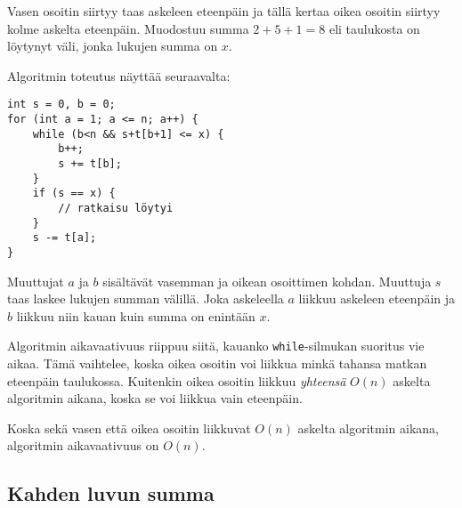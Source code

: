 Vasen osoitin siirtyy taas askeleen eteenpäin
ja tällä kertaa oikea osoitin siirtyy kolme askelta
eteenpäin. Muodostuu summa $2+5+1=8$ eli taulukosta
on löytynyt väli, jonka lukujen summa on $x$.

\begin{center}
\end{center}

Algoritmin toteutus näyttää seuraavalta:

\begin{lstlisting}
int s = 0, b = 0;
for (int a = 1; a <= n; a++) {
    while (b<n && s+t[b+1] <= x) {
        b++;
        s += t[b];
    }
    if (s == x) {
        // ratkaisu löytyi
    }
    s -= t[a];
}
\end{lstlisting}

Muuttujat $a$ ja $b$ sisältävät vasemman ja oikean
osoittimen kohdan.
Muuttuja $s$ taas laskee lukujen summan välillä.
Joka askeleella $a$ liikkuu askeleen eteenpäin
ja $b$ liikkuu niin kauan kuin summa on enintään $x$.

Algoritmin aikavaativuus riippuu siitä,
kauanko \texttt{while}-silmukan suoritus vie aikaa.
Tämä vaihtelee, koska oikea osoitin voi liikkua
minkä tahansa matkan eteenpäin taulukossa.
Kuitenkin oikea osoitin liikkuu \textit{yhteensä}
$O(n)$ askelta algoritmin aikana, koska se voi
liikkua vain eteenpäin.

Koska sekä vasen että oikea osoitin liikkuvat
$O(n)$ askelta algoritmin aikana,
algoritmin aikavaativuus on $O(n)$.

\subsection{Kahden luvun summa}

